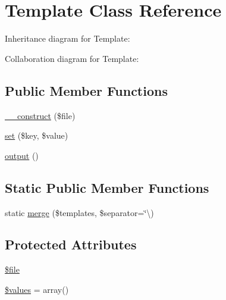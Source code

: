 \hypertarget{class_w_a_f_f_l_e_1_1_framework_1_1_engines_1_1_template}{}\section{Template Class Reference}
\label{class_w_a_f_f_l_e_1_1_framework_1_1_engines_1_1_template}


Inheritance diagram for Template\+:


Collaboration diagram for Template\+:
\subsection*{Public Member Functions}
\begin{DoxyCompactItemize}
\item 
\hyperlink{class_w_a_f_f_l_e_1_1_framework_1_1_engines_1_1_template_a8ef77288a5f940c68ebc57fdf0102078}{\+\_\+\+\_\+construct} (\$file)
\item 
\hyperlink{class_w_a_f_f_l_e_1_1_framework_1_1_engines_1_1_template_aab787bd83f84f4215dceb35f7c305eee}{set} (\$key, \$value)
\item 
\hyperlink{class_w_a_f_f_l_e_1_1_framework_1_1_engines_1_1_template_a3939045b11b9aaefdf692feb963f0dfc}{output} ()
\end{DoxyCompactItemize}
\subsection*{Static Public Member Functions}
\begin{DoxyCompactItemize}
\item 
static \hyperlink{class_w_a_f_f_l_e_1_1_framework_1_1_engines_1_1_template_a35932dacc685dbaaf413695f6dd67f36}{merge} (\$templates, \$separator=\char`\"{}\textbackslash{})
\end{DoxyCompactItemize}
\subsection*{Protected Attributes}
\begin{DoxyCompactItemize}
\item 
\hyperlink{class_w_a_f_f_l_e_1_1_framework_1_1_engines_1_1_template_a823f9d8bf697d2dd19672687804d05b4}{\$file}
\item 
\hyperlink{class_w_a_f_f_l_e_1_1_framework_1_1_engines_1_1_template_a46220846a73e3618f122b00d8c898308}{\$values} = array()
\end{DoxyCompactItemize}



